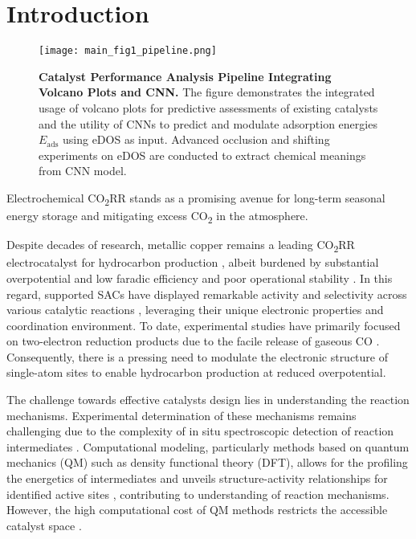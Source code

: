 
\section{Introduction}
\label{main_sec_intro}

\begin{figure}[htbp]
    \centering
    \texttt{[image: main\_fig1\_pipeline.png]}
    \caption{\textbf{Catalyst Performance Analysis Pipeline Integrating Volcano Plots and CNN.}
    The figure demonstrates the integrated usage of volcano plots for
    predictive assessments of existing catalysts and the utility of CNNs
    to predict and modulate adsorption energies \(E_{\text{ads}}\) using eDOS as input.
    Advanced occlusion and shifting experiments on eDOS are conducted to extract chemical meanings from CNN model.}
    \label{main_fig1:pipeline}
\end{figure}

Electrochemical CO\textsubscript{2}RR stands as a promising avenue for long-term
seasonal energy storage \cite{dinh2018co2} and mitigating excess CO\textsubscript{2} in the atmosphere.

Despite decades of research, metallic copper remains a leading CO\textsubscript{2}RR electrocatalyst
for hydrocarbon production \cite{osella2023co2}, albeit burdened by substantial overpotential
and low faradic efficiency and poor operational stability \cite{chen2019identifying, liu2021co2}.
In this regard, supported SACs have displayed remarkable activity and selectivity
across various catalytic reactions \cite{wang2018heterogeneous, yang2018atomically},
leveraging their unique electronic properties and coordination environment.
To date, experimental studies have primarily focused on two-electron reduction products
due to the facile release of gaseous CO \cite{cai2021insights, ju2017understanding, ren2019isolated}.
Consequently, there is a pressing need to modulate the electronic structure of single-atom sites
to enable hydrocarbon production at reduced overpotential.

The challenge towards effective catalysts design lies in understanding the reaction mechanisms.
Experimental determination of these mechanisms remains challenging due to
the complexity of in situ spectroscopic detection of reaction intermediates \cite{zhao2021revisiting}.
Computational modeling, particularly methods based on quantum mechanics (QM) such as density functional theory (DFT),
allows for the profiling the energetics of intermediates and unveils structure-activity relationships
for identified active sites \cite{feaster2017understanding, carter2008challenges},
contributing to understanding of reaction mechanisms.
However, the high computational cost of QM methods restricts the
accessible catalyst space \cite{jinnouchi2017predicting, cuenya2015nanocatalysis, goldsmith2018machine}.

